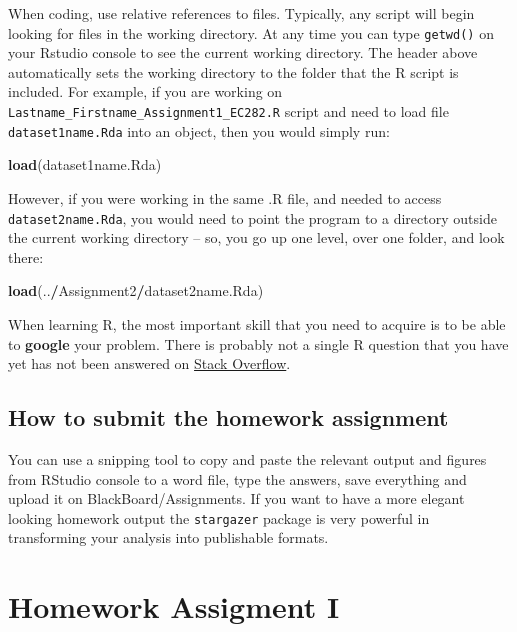\documentclass[
]{book}
\newenvironment{Shaded}{\begin{snugshade}}{\end{snugshade}}
\newcommand{\KeywordTok}[1]{\textcolor[rgb]{0.13,0.29,0.53}{\textbf{#1}}}
\newcommand{\NormalTok}[1]{#1}
\newcommand{\OperatorTok}[1]{\textcolor[rgb]{0.81,0.36,0.00}{\textbf{#1}}}
\begin{document}
When coding, use relative references to files. Typically, any script will begin looking for files in the working directory. At any time you can type \texttt{getwd()} on your Rstudio console to see the current working directory. The header above automatically sets the working directory to the folder that the R script is included. For example, if you are working on \texttt{Lastname\_Firstname\_Assignment1\_EC282.R} script and need to load file \texttt{dataset1name.Rda} into an object, then you would simply run:

\begin{Shaded}
\begin{Highlighting}[]
\KeywordTok{load}\NormalTok{(dataset1name.Rda)}
\end{Highlighting}
\end{Shaded}

However, if you were working in the same .R file, and needed to access \texttt{dataset2name.Rda}, you would need to point the program to a directory outside the current working directory -- so, you go up one level, over one folder, and look there:

\begin{Shaded}
\begin{Highlighting}[]
\KeywordTok{load}\NormalTok{(..}\OperatorTok{/}\NormalTok{Assignment2}\OperatorTok{/}\NormalTok{dataset2name.Rda)}
\end{Highlighting}
\end{Shaded}

When learning R, the most important skill that you need to acquire is to be able to \textbf{google} your problem. There is probably not a single R question that you have yet has not been answered on \href{https://stackoverflow.com/}{Stack Overflow}.

\hypertarget{how-to-submit-the-homework-assignment}{%
\section{How to submit the homework assignment}\label{how-to-submit-the-homework-assignment}}

You can use a snipping tool to copy and paste the relevant output and figures from RStudio console to a word file, type the answers, save everything and upload it on BlackBoard/Assignments. If you want to have a more elegant looking homework output the \texttt{stargazer} package is very powerful in transforming your analysis into publishable formats.

\hypertarget{homework-assigment-i}{%
\chapter{Homework Assigment I}\label{homework-assigment-i}}
\end{document}

